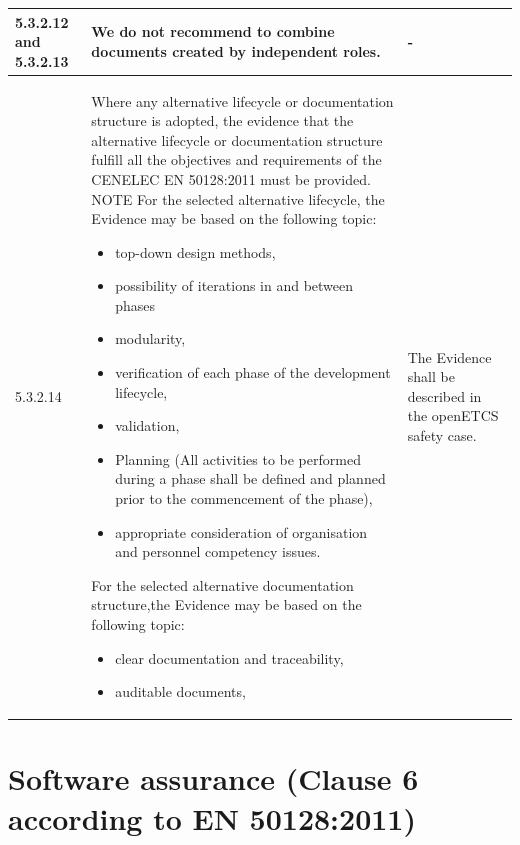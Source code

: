\documentclass{template/openetcs_report}
\begin{document}
{\begin{longtable}{|p{2cm}|p{9cm}|p{3cm}|}
\hline
5.3.2.12 and 5.3.2.13 & We do not recommend to combine documents created by independent roles. 
& - \\ 
\hline
5.3.2.14 & Where any alternative lifecycle or documentation structure is adopted, the evidence that the alternative lifecycle or documentation structure fulfill all the objectives and requirements of the CENELEC EN 50128:2011 must be provided.
\linebreak
\linebreak
NOTE\linebreak
For the selected alternative lifecycle, the Evidence may be based on the following topic:
\begin{itemize}\itemsep=0pt
  \item top-down design methods,
  \item possibility of iterations in and between phases
  \item modularity,
  \item verification of each phase of the development lifecycle,
  \item validation,
  \item Planning (All activities to be performed during a phase shall be defined and planned prior to the commencement of the phase),
  \item appropriate consideration of organisation and personnel competency issues.
\end{itemize}


For the selected alternative documentation structure,the Evidence  may be based on the following topic:
\begin{itemize}\itemsep=0pt
  \item clear documentation and traceability,
  \item auditable documents,
\end{itemize}
& The Evidence shall be described in the openETCS safety case.\\ 
\hline
\end{longtable}}



\section{Software assurance (Clause 6 according to EN 50128:2011)}
\label{clause62}
\end{document}
